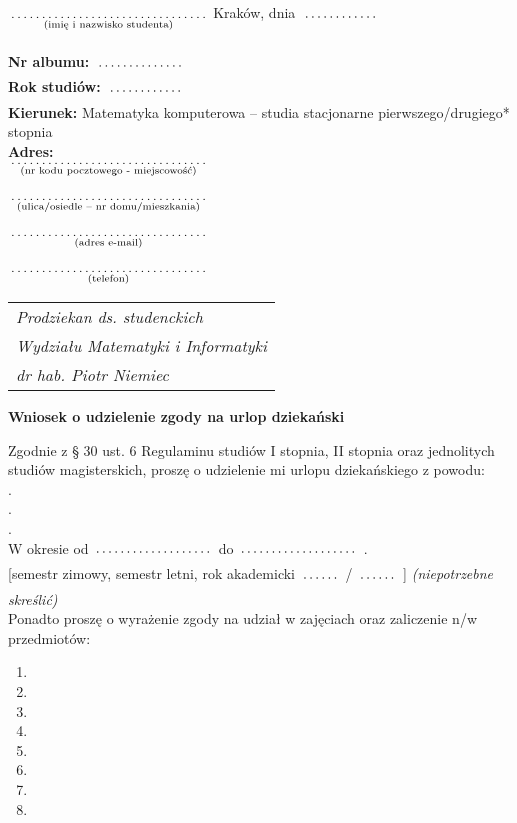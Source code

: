 \documentclass[a4paper,11pt]{article}
\newcommand{\fillField}[2]{
    $\underset{\text{#1}}{\parbox[t]{#2}{\dotfill}}$
}
\begin{document}
\noindent
\fillField{(imię i nazwisko studenta)}{5cm} \hfill Kraków, dnia \fillField{}{2cm} \\\\
\textbf{Nr albumu:}   \fillField{}{2.3cm}\\
\textbf{Rok studiów:} \fillField{}{2cm}\\
\textbf{Kierunek:} Matematyka komputerowa -- studia stacjonarne pierwszego/drugiego* stopnia\\
\textbf{Adres:}\\
\fillField{(nr kodu pocztowego - miejscowość)}{5cm}\\\\
\fillField{(ulica/osiedle – nr domu/mieszkania)}{5cm}\\\\
\fillField{(adres e-mail)}{5cm}\\\\
\fillField{(telefon)}{5cm}


\phantom{a}\hfill
\begin{tabular}[c]{@{}l@{}}
\textit{Prodziekan ds. studenckich} \\
\textit{Wydziału Matematyki i Informatyki}\\
\textit{dr hab. Piotr Niemiec}
\end{tabular}

\vskip 0.5cm

\begin{center}
{\Large \textbf{Wniosek o udzielenie zgody na urlop dziekański}}
\end{center}

\vskip 0.5cm

Zgodnie z § 30 ust. 6 Regulaminu studiów I stopnia, II stopnia oraz jednolitych studiów
magisterskich, proszę o udzielenie mi urlopu dziekańskiego z powodu:\\
.\dotfill\\
.\dotfill\\
.\dotfill\\
W okresie od \fillField{}{3cm} do \fillField{}{3cm}.\\
{[semestr zimowy, semestr letni, rok akademicki \fillField{}{1cm}/\fillField{}{1cm}]}
\textit{    (niepotrzebne skreślić)}\\
Ponadto proszę o wyrażenie zgody na udział w zajęciach oraz zaliczenie n/w przedmiotów:

    \begin{multicols}{2}
    \begin{enumerate}
        \item \dotfill
        \item \dotfill
        \item \dotfill
        \item \dotfill
        \item \dotfill
        \item \dotfill
        \item \dotfill
        \item \dotfill
    \end{enumerate}
    \end{multicols}
\end{document}
